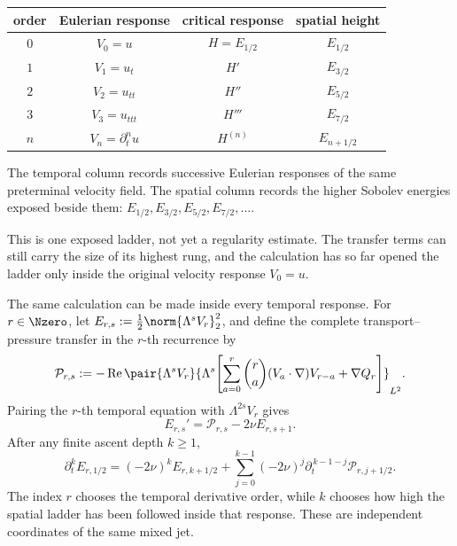 \begin{center}
\captionsetup{hypcap=false}
\label{tab:BodyTemporalSpatialDiscovery}
\small
\renewcommand{\arraystretch}{1.2}
\begin{tabular}{@{}c c c c@{}}
\toprule
order & Eulerian response & critical response & spatial height \\
\midrule
\(0\) & \(V_0=u\) & \(H=E_{1/2}\) & \(E_{1/2}\) \\
\(1\) & \(V_1=u_t\) & \(H'\) & \(E_{3/2}\) \\
\(2\) & \(V_2=u_{tt}\) & \(H''\) & \(E_{5/2}\) \\
\(3\) & \(V_3=u_{ttt}\) & \(H'''\) & \(E_{7/2}\) \\
\(n\) & \(V_n=\partial_t^nu\) & \(H^{(n)}\) & \(E_{n+1/2}\) \\
\bottomrule
\end{tabular}
\end{center}

The temporal column records successive Eulerian responses of the same preterminal velocity field.
The spatial column records the higher Sobolev energies exposed beside them:
\(E_{1/2},E_{3/2},E_{5/2},E_{7/2},\ldots\).

This is one exposed ladder, not yet a regularity estimate.
The transfer terms can still carry the size of its highest rung, and the calculation has so far opened the ladder only inside the original velocity response \(V_0=u\).

The same calculation can be made inside every temporal response.
For \(r\in\Nzero\), let \(E_{r,s}:=\tfrac12\norm{\Lambda^sV_r}_2^2\), and define the complete transport--pressure transfer in the \(r\)-th recurrence by
\[
  \mathcal P_{r,s}
  :=-
  \operatorname{Re}
  \pair{\Lambda^sV_r}
  {\Lambda^s\!\left[
    \sum_{a=0}^{r}\binom{r}{a}(V_a\cdot\nabla)V_{r-a}
    +\nabla Q_r
  \right]}_{L^2}.
\]
Pairing the \(r\)-th temporal equation with \(\Lambda^{2s}V_r\) gives
\begin{equation}\label{eq:BodyEveryTemporalRowSpatialEnergy}
  E_{r,s}'=\mathcal P_{r,s}-2\nu E_{r,s+1}.
\end{equation}
After any finite ascent depth \(k\geq1\),
\begin{equation}\label{eq:BodyEveryTemporalRowCompletedHeight}
  \partial_t^kE_{r,1/2}
  =(-2\nu)^kE_{r,k+1/2}
  +\sum_{j=0}^{k-1}
  (-2\nu)^j
  \partial_t^{\,k-1-j}\mathcal P_{r,j+1/2}.
\end{equation}
The index \(r\) chooses the temporal derivative order, while \(k\) chooses how high the spatial ladder has been followed inside that response.
These are independent coordinates of the same mixed jet.

